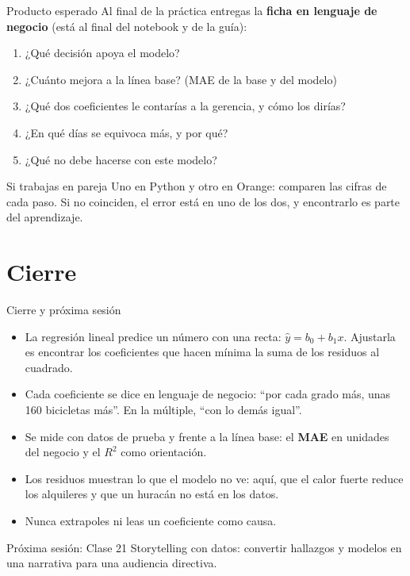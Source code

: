 \documentclass[aspectratio=169,11pt]{beamer}
\begin{document}
\begin{frame}[t]{Producto esperado}
  \small
  Al final de la práctica entregas la \textbf{ficha en lenguaje de negocio}
  (está al final del notebook y de la guía):
  \vspace{0.1cm}
  \begin{enumerate}
    \small
    \item ¿Qué decisión apoya el modelo?
    \item ¿Cuánto mejora a la línea base? (MAE de la base y del modelo)
    \item ¿Qué dos coeficientes le contarías a la gerencia, y cómo los
      dirías?
    \item ¿En qué días se equivoca más, y por qué?
    \item ¿Qué no debe hacerse con este modelo?
  \end{enumerate}
  \vspace{0.1cm}
  \begin{block}{Si trabajas en pareja}
    \footnotesize Uno en Python y otro en Orange: comparen las cifras de
    cada paso. Si no coinciden, el error está en uno de los dos, y
    encontrarlo es parte del aprendizaje.
  \end{block}
\end{frame}

\section{Cierre}
\begin{frame}[t]{Cierre y próxima sesión}
  \begin{itemize}
    \footnotesize
    \item La regresión lineal predice un número con una recta:
      $\hat{y} = b_0 + b_1 x$. Ajustarla es encontrar los coeficientes que
      hacen mínima la suma de los residuos al cuadrado.
    \item Cada coeficiente se dice en lenguaje de negocio: ``por cada grado
      más, unas 160 bicicletas más''. En la múltiple, ``con lo demás
      igual''.
    \item Se mide con datos de prueba y frente a la línea base: el
      \textbf{MAE} en unidades del negocio y el \textbf{$R^2$} como
      orientación.
    \item Los residuos muestran lo que el modelo no ve: aquí, que el calor
      fuerte reduce los alquileres y que un huracán no está en los datos.
    \item Nunca extrapoles ni leas un coeficiente como causa.
  \end{itemize}
  \vspace{0.1cm}
  \begin{block}{Próxima sesión: Clase 21}
    \footnotesize Storytelling con datos: convertir hallazgos y modelos en
    una narrativa para una audiencia directiva.
  \end{block}
\end{frame}
\end{document}
